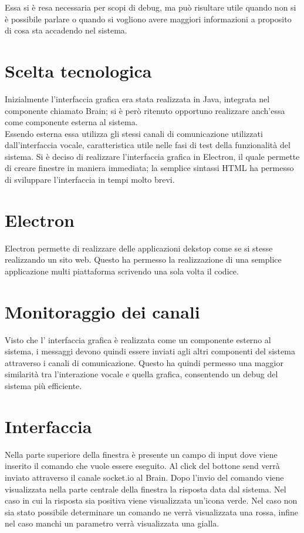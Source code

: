 \documentclass[twoside]{supsistudent}
\begin{document}
Essa si è resa necessaria per scopi di debug, ma può risultare utile quando non si è possibile parlare o quando si vogliono avere maggiori informazioni a proposito di cosa sta accadendo nel sistema.
\section{Scelta tecnologica}
Inizialmente l'interfaccia grafica era stata realizzata in Java, integrata nel componente chiamato Brain; si è però ritenuto opportuno realizzare anch'essa come componente esterna al sistema.\\
Essendo esterna essa utilizza gli stessi canali di comunicazione utilizzati dall'interfaccia vocale, caratteristica utile nelle fasi di test della funzionalità del sistema.
Si è deciso di realizzare l'interfaccia grafica in Electron, il quale permette di creare finestre in maniera immediata; la semplice sintassi HTML ha permesso di sviluppare l'interfaccia in tempi molto brevi. \cite{electron}
\section{Electron}
Electron permette di realizzare delle applicazioni dekstop come se si stesse realizzando un sito web. Questo ha permesso la realizzazione di una semplice applicazione multi piattaforma scrivendo una sola volta il codice.
\section{Monitoraggio dei canali}
Visto che l' interfaccia grafica è realizzata come un componente esterno al sistema, i messaggi devono quindi essere inviati agli altri componenti del sistema attraverso i canali di comunicazione. Questo ha quindi permesso una maggior similarità tra l'interazione vocale e quella grafica, consentendo un debug del sistema più efficiente.
\section{Interfaccia}
Nella parte superiore della finestra è presente un campo di input dove viene inserito il comando che vuole essere eseguito. Al click del bottone send verrà inviato attraverso il canale socket.io al Brain.
Dopo l'invio del comando viene visualizzata nella parte centrale della finestra la risposta data dal sistema.
Nel caso in cui la risposta sia positiva viene visualizzata un'icona verde. Nel caso non sia stato possibile determinare un comando ne verrà visualizzata una rossa, infine nel caso manchi un parametro verrà visualizzata una gialla.
\end{document}
